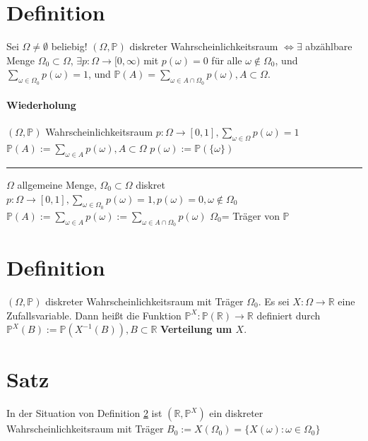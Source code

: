 \documentclass[a4paper,11pt,notitlepage]{report}
\newcommand{\R}{{\ensuremath{\mathbb{R}}}}
\newcommand{\Prim}{{\ensuremath{\mathbb{P}}}}
\begin{document}
\section{Definition}
Sei $\Omega \neq \emptyset$ beliebig!
$(\Omega, \Prim)$ diskreter Wahrscheinlichkeitsraum $\Leftrightarrow \exists$ abzählbare Menge $\Omega_0 \subset \Omega$, $\exists p \colon \Omega \rightarrow [0, \infty)$ mit $p(\omega)=0$ für alle $\omega \notin \Omega_0$, und $\sum\limits_{\omega \in \Omega_0}{p(\omega)} = 1$, und $\Prim(A) = \sum \limits_{\omega \in A \cap \Omega_0}{p(\omega)}, A \subset \Omega$.

\paragraph{Wiederholung}
$(\Omega, \Prim)$ Wahrscheinlichkeitsraum
\newline
$p \colon \Omega \rightarrow [0,1], \sum\limits_{\omega \in \Omega}{p(\omega)} = 1$
\newline
$\Prim(A):=\sum\limits_{\omega \in A}{p(\omega)}, A \subset \Omega$
\newline
$p(\omega) := \Prim(\{\omega\})$
\newline
\hrule
\vspace{10pt}
$\Omega$ allgemeine Menge, $\Omega_0 \subset \Omega$ diskret
\newline
$p \colon \Omega \rightarrow [0,1], \sum\limits_{\omega \in \Omega_0}{p(\omega)}=1, p(\omega) = 0, \omega \notin \Omega_0$
\newline
$\Prim(A):= \sum\limits_{\omega \in A}{p(\omega)}:=\sum\limits_{\omega \in A \cap \Omega_0}{p(\omega)}$
\newline
$\Omega_0$= Träger von $\Prim$

\section{Definition}
\label{defVerteilung}
$(\Omega, \Prim)$ diskreter Wahrscheinlichkeitsraum  mit Träger $\Omega_0$.
Es sei $X \colon \Omega \rightarrow \R$ eine Zufallsvariable.
Dann heißt die Funktion $\Prim^X \colon \Prim(\R) \rightarrow \R$ definiert durch 
$\Prim^X(B):= \Prim\left(X^{-1}(B)\right), B \subset \R$ \textbf{Verteilung um $X$}.

\section{Satz}
In der Situation von Definition \ref{defVerteilung} ist $(\R,\Prim^X)$ ein diskreter Wahrscheinlichkeitsraum mit Träger $B_0 := X(\Omega_0) = \{X(\omega) \colon \omega \in \Omega_0 \}$ 
\end{document}
